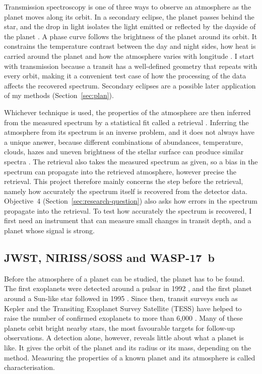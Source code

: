 Transmission spectroscopy is one of three ways to observe an atmosphere as the
planet moves along its orbit. In a secondary eclipse, the planet passes behind
the star, and the drop in light isolates the light emitted or reflected by the dayside of the planet \citep{DemingEtAl2005,CoulombeEtAl2023,GressierEtAl2024}. A phase
curve follows the brightness of the planet around its orbit. It constrains the
temperature contrast between the day and night sides, how heat is carried
around the planet and how the atmosphere varies with longitude
\citep{KnutsonEtAl2007,MikalEvansEtAl2023,KemptonEtAl2023,SplinterEtAl2025}.
I start with transmission because a transit has a well-defined geometry that repeats with every orbit, making it a convenient test case of how the processing of the data affects the recovered spectrum. Secondary
eclipses are a possible later application of my methods
(Section~\ref{sec:plan}).

Whichever technique is used, the properties of the atmosphere are then
inferred from the measured spectrum by a statistical fit called a retrieval
\citep{BarstowHeng2020}. Inferring the atmosphere from its spectrum is an inverse problem, and it does not always have a unique answer, because different combinations of abundances, temperature, clouds, hazes and uneven brightness of the stellar surface can produce similar spectra \citep{RackhamEtAl2018,Madhusudhan2019}. The retrieval also takes the measured
spectrum as given, so a bias in the spectrum can propagate into the retrieved atmosphere, however precise the retrieval. This project therefore mainly
concerns the step before the retrieval, namely how accurately the spectrum
itself is recovered from the detector data. Objective~4
(Section~\ref{sec:research-question}) also asks how errors in the spectrum
propagate into the retrieval. To test how accurately the spectrum is recovered, I first need an instrument that can measure small changes in transit depth, and a planet whose
signal is strong. 

\subsection{JWST, NIRISS/SOSS and WASP-17~b}
\label{sec:jwst-soss-wasp17}

Before the atmosphere of a planet can be studied, the planet has to be found.
The first exoplanets were detected around a pulsar in 1992
\citep{WolszczanFrail1992}, and the first planet around a Sun-like star
followed in 1995 \citep{MayorQueloz1995}. Since then, transit surveys such as
Kepler and the Transiting Exoplanet Survey Satellite (TESS)
\citep{BoruckiEtAl2010,RickerEtAl2015} have helped to raise the number of
confirmed exoplanets to more than 6,000 \citep{NASAExoplanetArchive2026}.
Many of these planets orbit bright nearby stars, the most favourable targets
for follow-up observations. A detection alone, however, reveals little about
what a planet is like. It gives the orbit of the planet and its radius or its
mass, depending on the method.  Measuring the properties of a
known planet and its atmosphere is called characterisation.

